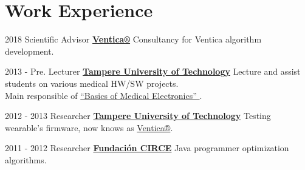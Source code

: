 \documentclass[letterpaper]{twentysecondcv} %
\begin{document}
\section{Work Experience}        
\begin{twenty}
	\twentyitem
    	{2018}
        {Scientific Advisor}
        {\href{https://www.ventica.net/}{\textbf{Ventica®}}}
        {}%
        {Consultancy for Ventica algorithm development.}
        
	\twentyitem
    	{2013 - Pre.}
        {Lecturer}
        {\href{https://www.tut.fi/}{\textbf{Tampere University of Technology}}}
        {}%
        {Lecture and assist students on various medical HW/SW projects.  
        \\ Main responsible of 
\href{https://www.youtube.com/watch?time_continue=1&v=E3D8rAG6S4Q}{“Basics of Medical Electronics” }.
        }

	\twentyitem
    	{2012 - 2013}
        {Researcher}
        {\href{https://www.tut.fi/}{\textbf{Tampere University of Technology}}}
         {}%
        {Testing wearable's firmware, now knows as \href{https://www.ventica.net/}{Ventica®}.   }

	\twentyitem
    	{2011 - 2012}
        {Researcher}
        {\href{https://http://www.fcirce.es//}{\textbf{Fundaci\'on CIRCE}}}
        {}%
        {Java programmer optimization algorithms.}
\end{twenty}






\end{document}
